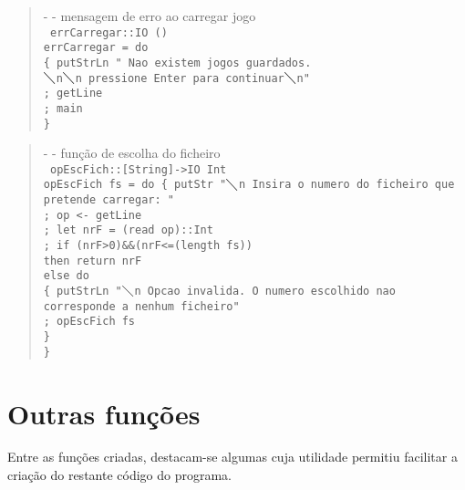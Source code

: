 \documentclass[a4paper,titlepage]{scrreprt}
\begin{document}
	\begin{quote}
		{\small - - mensagem de erro ao carregar jogo\\}
		{\tt
		errCarregar::IO ()\\
		errCarregar = do\\
		\{ putStrLn " Nao existem jogos guardados.\\
		$\diagdown$n$\diagdown$n pressione Enter para continuar$\diagdown$n"\\
		; getLine\\
		; main\\
		\}
		}
	\end{quote}
	\begin{quote}
		{\small - - função de escolha do ficheiro\\}
		{\tt
		opEscFich::[String]->IO Int\\
		opEscFich fs = do
		\{ putStr "$\diagdown$n Insira o numero do ficheiro que pretende carregar: "\\
		; op <- getLine\\
		; let nrF = (read op)::Int\\
		; if (nrF>0)\&\&(nrF<=(length fs))\\
		then return nrF\\
		else do\\
		\{ putStrLn "$\diagdown$n Opcao invalida. O numero escolhido nao corresponde a nenhum ficheiro"\\
		; opEscFich fs\\
		\}\\
		\}
		}
	\end{quote}
\chapter{Outras funções}
Entre as funções criadas, destacam-se algumas cuja utilidade permitiu facilitar a criação do restante código do programa.
\end{document}
